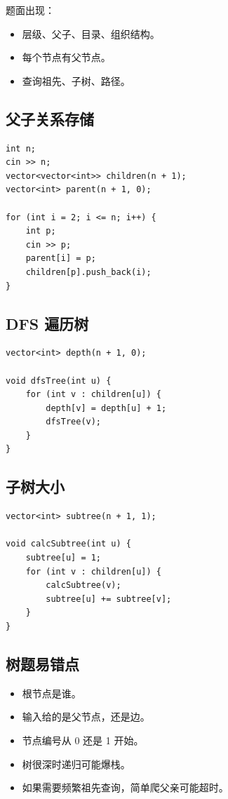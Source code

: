 题面出现：

\begin{itemize}
  \item 层级、父子、目录、组织结构。
  \item 每个节点有父节点。
  \item 查询祖先、子树、路径。
\end{itemize}

\subsection{父子关系存储}

\begin{lstlisting}
int n;
cin >> n;
vector<vector<int>> children(n + 1);
vector<int> parent(n + 1, 0);

for (int i = 2; i <= n; i++) {
    int p;
    cin >> p;
    parent[i] = p;
    children[p].push_back(i);
}
\end{lstlisting}

\subsection{DFS 遍历树}

\begin{lstlisting}
vector<int> depth(n + 1, 0);

void dfsTree(int u) {
    for (int v : children[u]) {
        depth[v] = depth[u] + 1;
        dfsTree(v);
    }
}
\end{lstlisting}

\subsection{子树大小}

\begin{lstlisting}
vector<int> subtree(n + 1, 1);

void calcSubtree(int u) {
    subtree[u] = 1;
    for (int v : children[u]) {
        calcSubtree(v);
        subtree[u] += subtree[v];
    }
}
\end{lstlisting}

\subsection{树题易错点}

\begin{itemize}
  \item 根节点是谁。
  \item 输入给的是父节点，还是边。
  \item 节点编号从 0 还是 1 开始。
  \item 树很深时递归可能爆栈。
  \item 如果需要频繁祖先查询，简单爬父亲可能超时。
\end{itemize}

